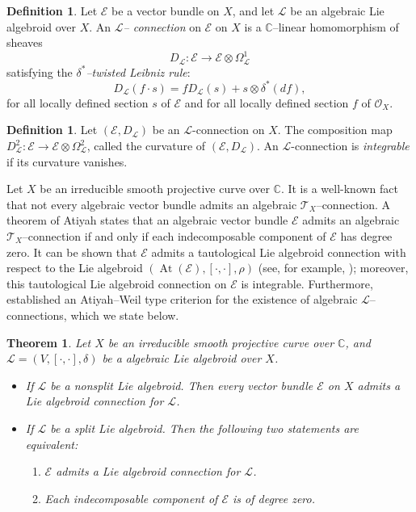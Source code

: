 \documentclass[12pt,reqno]{amsart}
\newcommand{\mc}[1]{\mathcal{#1}}
\newcommand{\bb}[1]{\mathbb{#1}}
\numberwithin{equation}{subsection}
\newtheorem{thm}[equation]{Theorem}
\theoremstyle{definition}
\newtheorem{defn}[equation]{Definition}
\theoremstyle{theorem}
\begin{document}
\begin{defn}\label{def:Lie-alg-conn-on-VB}
	Let $\mathcal{E}$ be a vector bundle on $X$, and let $\mathcal{L}$ be an algebraic Lie algebroid over $X$. An {\it $\mc L$-- connection} on  
	$\mc E$ on $X$ is a $\bb C$--linear homomorphism of sheaves 
	$$D_{\mathcal{L}} : \mc E \longrightarrow \mc E\otimes \Omega^{1}_{\mathcal{L}}$$ 
	satisfying the {\it $\delta^*$--twisted Leibniz rule}: 
	\begin{equation}\label{eqn:phi^*-twisted-Leibniz-rule}
		D_{\mathcal{L}}(f\cdot s) = fD_{\mathcal{L}}(s)+s\otimes\delta^*(df), 
	\end{equation}
	for all locally defined section $s$ of $\mc E$ and for all locally defined 
	section $f$ of $\mc O_X$. 
\end{defn}
\begin{defn}
Let $(\mathcal{E},D_{\mathcal{L}})$ be an $\mathcal{L}$-connection on $X$. The composition map $D^{2}_{\mathcal{L}}:\mathcal{E}\rightarrow \mathcal{E}\otimes \Omega^{2}_{\mathcal{L}}$, called the curvature of $(\mathcal{E},D_{\mathcal{L}})$. An $\mathcal{L}$-connection is \textit{integrable} if its curvature vanishes.
\end{defn}
Let $X$ be an irreducible smooth projective curve over $\mathbb{C}$. It is a well-known fact that not every algebraic vector bundle admits an algebraic $\mathcal{T}_{X}$--connection. A theorem of Atiyah \cite{Atiyah-1957} states that an algebraic vector bundle $\mathcal{E}$ admits an algebraic $\mathcal{T}_{X}$--connection if and only if each indecomposable component of $\mathcal{E}$ has degree zero. It can be shown that $\mathcal{E}$ admits a tautological Lie algebroid connection with respect to the Lie algebroid $(\operatorname{At}(\mathcal{E}), [\cdot,\cdot], \rho)$ (see, for example, \cite{ABKA-2025}); moreover, this tautological Lie algebroid connection on $\mathcal{E}$ is integrable. Furthermore, \cite{ABKA-2025} established an Atiyah--Weil type criterion for the existence of algebraic $\mathcal{L}$--connections, which we state below.

\begin{thm}\cite[\S\,1, Theorem 1.1]{ABKA-2025}
Let $X$ be an irreducible smooth projective curve over $\mathbb{C}$, and $\mathcal{L}=(V, [\cdot,\cdot],\delta)$ be a algebraic Lie algebroid over $X$.
\begin{itemize}
\item If $\mathcal{L}$ be a nonsplit Lie algebroid. Then every vector bundle $\mathcal{E}$ on $X$ admits a Lie algebroid connection for $\mathcal{L}$.
\item If $\mathcal{L}$ be a split Lie algebroid. Then the following two statements are equivalent:
\begin{enumerate}
\item $\mathcal{E}$ admits a Lie algebroid connection for $\mathcal{L}$.
\item Each indecomposable component of $\mathcal{E}$ is of degree zero.
\end{enumerate}
\end{itemize}
\end{thm}
\end{document}
